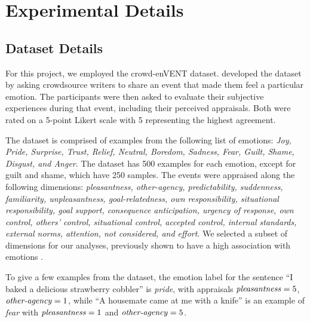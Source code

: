 \section{Experimental Details}


\subsection{Dataset Details} \label{app:dataset}
For this project, we employed the crowd-enVENT dataset. \citet{envent} developed the dataset by asking crowdsource writers to share an event that made them feel a particular emotion. The participants were then asked to evaluate their subjective experiences during that event, including their perceived appraisals. Both were rated on a 5-point Likert scale with 5 representing the highest agreement. 

The dataset is comprised of examples from the following list of emotions: \textit{Joy, Pride, Surprise, Trust, Relief, Neutral, Boredom, Sadness, Fear, Guilt, Shame, Disgust, and Anger}. The dataset has 500 examples for each emotion, except for guilt and shame, which have 250 samples. The events were appraised along the following dimensions:  
\textit{pleasantness, other-agency, predictability, suddenness, familiarity, unpleasantness, goal-relatedness, 
own responsibility,  situational responsibility, goal support,
consequence anticipation, urgency of response, own control, others’ control, situational control, accepted control, internal standards, external norms, attention, not considered, and effort}. We selected a subset of dimensions for our analyses, previously shown to have a high association with emotions \cite{Ellsworth2015, tak2024gpt4emulatesaveragehumanemotional}.


To give a few examples from the dataset, the emotion label for the sentence ``I baked a delicious strawberry cobbler'' is \textit{pride}, with appraisals $\text{\textit{pleasantness}}=5$, $\text{\textit{other-agency}}=1$, while ``A housemate came at me with a knife'' is an example of \textit{fear} with $\text{\textit{pleasantness}}=1$ and $\text{\textit{other-agency}}=5$.

